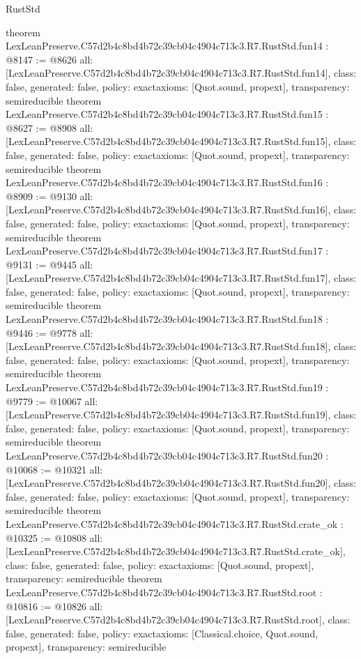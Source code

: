 \begin{lexlean}{RustStd}
\begin{coremodule}
{}
theorem LexLeanPreserve.C57d2b4c8bd4b72c39cb04c4904c713c3.R7.RustStd.fun14 : @8147 := @8626 {
  all: [LexLeanPreserve.C57d2b4c8bd4b72c39cb04c4904c713c3.R7.RustStd.fun14],
  class: false,
  generated: false,
  policy: exact{axioms: [Quot.sound, propext]},
  transparency: semireducible
}
theorem LexLeanPreserve.C57d2b4c8bd4b72c39cb04c4904c713c3.R7.RustStd.fun15 : @8627 := @8908 {
  all: [LexLeanPreserve.C57d2b4c8bd4b72c39cb04c4904c713c3.R7.RustStd.fun15],
  class: false,
  generated: false,
  policy: exact{axioms: [Quot.sound, propext]},
  transparency: semireducible
}
theorem LexLeanPreserve.C57d2b4c8bd4b72c39cb04c4904c713c3.R7.RustStd.fun16 : @8909 := @9130 {
  all: [LexLeanPreserve.C57d2b4c8bd4b72c39cb04c4904c713c3.R7.RustStd.fun16],
  class: false,
  generated: false,
  policy: exact{axioms: [Quot.sound, propext]},
  transparency: semireducible
}
theorem LexLeanPreserve.C57d2b4c8bd4b72c39cb04c4904c713c3.R7.RustStd.fun17 : @9131 := @9445 {
  all: [LexLeanPreserve.C57d2b4c8bd4b72c39cb04c4904c713c3.R7.RustStd.fun17],
  class: false,
  generated: false,
  policy: exact{axioms: [Quot.sound, propext]},
  transparency: semireducible
}
theorem LexLeanPreserve.C57d2b4c8bd4b72c39cb04c4904c713c3.R7.RustStd.fun18 : @9446 := @9778 {
  all: [LexLeanPreserve.C57d2b4c8bd4b72c39cb04c4904c713c3.R7.RustStd.fun18],
  class: false,
  generated: false,
  policy: exact{axioms: [Quot.sound, propext]},
  transparency: semireducible
}
theorem LexLeanPreserve.C57d2b4c8bd4b72c39cb04c4904c713c3.R7.RustStd.fun19 : @9779 := @10067 {
  all: [LexLeanPreserve.C57d2b4c8bd4b72c39cb04c4904c713c3.R7.RustStd.fun19],
  class: false,
  generated: false,
  policy: exact{axioms: [Quot.sound, propext]},
  transparency: semireducible
}
theorem LexLeanPreserve.C57d2b4c8bd4b72c39cb04c4904c713c3.R7.RustStd.fun20 : @10068 := @10321 {
  all: [LexLeanPreserve.C57d2b4c8bd4b72c39cb04c4904c713c3.R7.RustStd.fun20],
  class: false,
  generated: false,
  policy: exact{axioms: [Quot.sound, propext]},
  transparency: semireducible
}
theorem LexLeanPreserve.C57d2b4c8bd4b72c39cb04c4904c713c3.R7.RustStd.crate_ok : @10325 := @10808 {
  all: [LexLeanPreserve.C57d2b4c8bd4b72c39cb04c4904c713c3.R7.RustStd.crate_ok],
  class: false,
  generated: false,
  policy: exact{axioms: [Quot.sound, propext]},
  transparency: semireducible
}
theorem LexLeanPreserve.C57d2b4c8bd4b72c39cb04c4904c713c3.R7.RustStd.root : @10816 := @10826 {
  all: [LexLeanPreserve.C57d2b4c8bd4b72c39cb04c4904c713c3.R7.RustStd.root],
  class: false,
  generated: false,
  policy: exact{axioms: [Classical.choice, Quot.sound, propext]},
  transparency: semireducible
}


\end{coremodule}
\end{lexlean}
